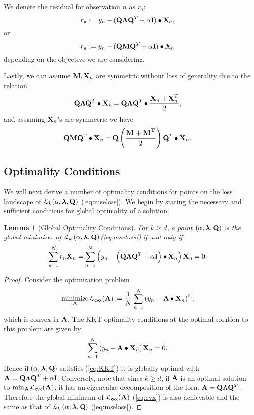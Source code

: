 \documentclass[11pt]{article}
\theoremstyle{plain}
\newtheorem{lemma}{Lemma}
\DeclareMathOperator*{\minimize}{minimize}
\theoremstyle{plain}
\numberwithin{equation}{section}
\numberwithin{lemma}{section}
\numberwithin{theorem}{section}
\numberwithin{corollary}{section}
\numberwithin{observation}{section}
\numberwithin{definition}{section}
\numberwithin{example}{section}
\begin{document}
We denote the residual for observation $n$ as $r_n$:
\[
r_n := y_n - (\Mx{Q} \Mx{\Lambda} \Mx{Q}^T + \alpha \Mx{I}) \bullet \Mx{X}_n,
\]
or 
\[
r_n : =   y_n - (\Mx{QMQ}^T + \alpha \Mx{I}) \bullet \Mx{X}_n
\]
depending on the objective we are considering. 

Lastly, we can assume $\Mx{M},\Mx{X}_n$ are symmetric without loss of generality due to the relation: 
\[
\Mx{Q} \Mx{\Lambda} \Mx{Q}^T \bullet \Mx{X}_n = \Mx{Q} \Mx{\Lambda} \Mx{Q}^T \bullet \frac{\Mx{X}_n+\Mx{X}_n^T}{2},
\]
and assuming $\Mx{X}_n$'s are symmetric we have
\[
\Mx{Q} \Mx{M} \Mx{Q}^T \bullet \Mx{X}_n = \Mx{Q} \left(\Mx{\frac{\Mx{M}+\Mx{M}^T}{2}}\right) \Mx{Q}^T \bullet \Mx{X}_n.
\]

\subsection{Optimality Conditions}

We will next derive a number of optimality conditions for points on the loss landscape of $\mathcal{L}_k(\alpha,\V{\lambda}, \Mx{Q})$ (\ref{eq:mseloss}). We begin by stating the necessary and sufficient conditions for global optimality of a solution.
\begin{lemma}[Global Optimality Conditions] \label{lem:KKT}
For $k \geq d$, a point $\left(\alpha,\V{\lambda}, \Mx{Q} \right)$ is the global minimizer of $\mathcal{L}_k \left( \alpha,{\V{\lambda},\Mx{Q}} \right)$(\ref{eq:mseloss}) if and only if 
\begin{equation} \label{eq:KKT}
\sum_{n = 1}^N r_n \Mx{X}_n = \sum_{n = 1}^N \left( y_n -  \left( \Mx{Q} \Mx{\Lambda} \Mx{Q}^T +\alpha \Mx{I} \right)\bullet \Mx{X}_n  \right) \Mx{X}_n = {0}.
\end{equation}
\end{lemma}
\begin{proof}
Consider the optimization problem 
\begin{equation} \label{eq:cvx}
\minimize_{\Mx{A}} \mathcal{L}_{\sf cvx}(\Mx{A}):= \frac{1}{N}\sum_{n=1}^N \left(y_n - \Mx{A} \bullet \Mx{X}_n \right)^2,
\end{equation}
which is convex in $\Mx{A}$. The KKT optimality conditions at the optimal solution to this problem are given by:
\begin{equation} \label{eq:cvx_KKT}
\sum_{n = 1}^N \left( y_n -  \Mx{A} \bullet \Mx{X}_n  \right) \Mx{X}_n = {0}.
\end{equation}
Hence if $\left(\alpha, \V{\lambda}, \Mx{Q} \right)$ satisfies (\ref{eq:KKT}) it is globally optimal with $\Mx{A} = \Mx{Q} \Mx{\Lambda} \Mx{Q}^T +\alpha \Mx{I}$. Conversely, note that since $k \geq d$, if $\Mx{A}$ is an optimal solution to $\min_{\Mx{A}} \mathcal{L}_{\sf cvx}(\Mx{A})$, it has an eigenvalue decomposition of the form $\Mx{A} = \Mx{Q} \Mx{\Lambda} \Mx{Q}^T$. Therefore the global minimum of $\mathcal{L}_{\sf cvx}(\Mx{A})$ (\ref{eq:cvx}) is also achievable and the same as that of $\mathcal{L}_k \left(\alpha, {\V{\lambda},\Mx{Q}} \right)$ (\ref{eq:mseloss}).
\end{proof}
\end{document}
